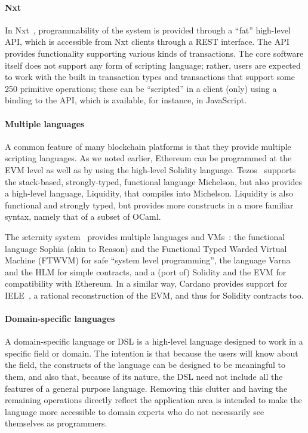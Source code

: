 \documentclass[runningheads]{llncs}
\begin{document}
\paragraph{Nxt}

In Nxt~\cite{Nxt}, programmability of the system is provided through a ``fat'' high-level 
API, which is accessible from Nxt clients through a REST interface. The API provides functionality supporting various 
kinds of transactions. The core software itself does not support any form of scripting language; rather, users are 
expected to work with the built in transaction types and transactions that support some 250 primitive operations; these 
can be ``scripted'' in a client (only) using a binding to the API, which is available, for instance, in JavaScript.

\paragraph{Multiple languages}

A common feature of many blockchain platforms is that they provide multiple scripting languages. As we noted earlier, 
Ethereum can be programmed at the EVM level as well as by using the high-level Solidity language. 
Tezos~\cite{tezos-white-paper} supports the stack-based, strongly-typed, functional language Michelson, but also 
provides a high-level language, Liquidity, that compiles into Michelson. Liquidity is also functional and strongly 
typed, but provides more constructs in a more familiar syntax, namely that of a subset of OCaml. 

The \ae{}ternity system~\cite{aeternity} provides multiple languages and VMs~\cite{Stenman-CODE-BEAM}: the functional language  Sophia (akin to 
Reason) and the Functional Typed Warded Virtual Machine (FTWVM) for safe ``system level programming'', the language 
Varna and the HLM for simple contracts, and a (port of) Solidity and the EVM for compatibility with Ethereum. In a 
similar way, Cardano provides support for IELE~\cite{IELE}, a rational reconstruction of the EVM, and thus for Solidity 
contracts too. 

\paragraph{Domain-specific languages} 

A domain-specific language or DSL is a high-level language designed to work in a specific field or domain. The intention 
is that because the users will know about the field, the constructs of the language can be designed to be meaningful to 
them, and also that, because of its nature, the DSL need not include all the features of a general purpose language. 
Removing this clutter and having the remaining operations directly reflect the application area is intended to make the 
language more accessible to domain experts who do not necessarily see themselves as programmers.
\end{document}
